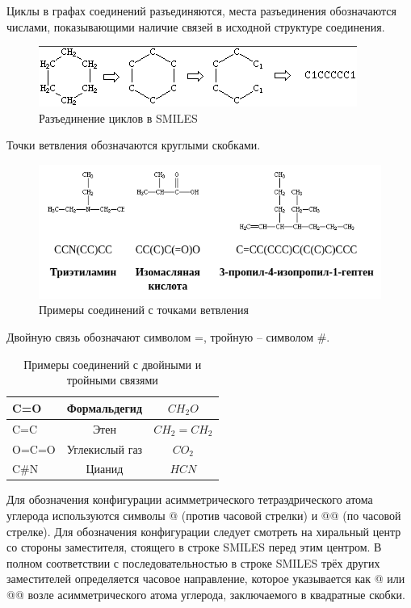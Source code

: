 \documentclass[a4paper,14pt]{extreport}
\begin{document}
Циклы в графах соединений разъединяются, места разъединения обозначаются числами, показывающими наличие связей в исходной структуре соединения.

\begin{figure}[htp]
\centering
\includegraphics[scale=1.20]{images/Screenshot from 2021-12-04 16-34-09.png}
\caption{Разъединение циклов в SMILES}
\label{cycles}
\end{figure}

Точки ветвления обозначаются круглыми скобками.

\begin{figure}[htp]
\centering
\includegraphics[scale=0.80]{images/Screenshot from 2021-12-04 16-45-58.png}
\caption{Примеры соединений с точками ветвления}
\label{branches}
\end{figure}

Двойную связь обозначают символом =, тройную – символом \#.

\begin{table}[H]
\begin{center}
\begin{tabular}{|l|c|c|}
\hline
	C=O & Формальдегид & $CH_2O$\\
\hline
	C=C & Этен & $CH_2=CH_2$\\
\hline
	O=C=O & Углекислый газ & $CO_2$\\
\hline
	C\#N & Цианид & $HCN$\\
\hline
\end{tabular}
\caption{Примеры соединений с двойными и тройными связями}
\end{center}
\end{table}

Для обозначения конфигурации асимметрического тетраэдрического атома углерода используются символы @ (против часовой стрелки) и @@ (по часовой стрелке). Для обозначения конфигурации следует смотреть на хиральный центр со стороны заместителя, стоящего в строке SMILES перед этим центром. В полном соответствии с последовательностью в строке SMILES трёх других заместителей определяется часовое направление, которое указывается как @ или @@ возле асимметрического атома углерода, заключаемого в квадратные скобки.
\end{document}
